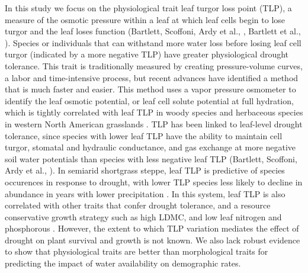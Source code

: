 \documentclass[12pt, letterpaper]{article}
\begin{document}
In this study we focus on the physiological trait leaf turgor loss point (TLP), a measure of the osmotic pressure within a leaf at which leaf cells begin to lose turgor and the leaf loses function (Bartlett, Scoffoni, Ardy et al., , Bartlett et al., ). Species or individuals that can withstand more water loss before losing leaf cell turgor (indicated by a more negative TLP) have greater physiological drought tolerance. This trait is traditionally measured by creating pressure-volume curves, a labor and time-intensive process, but recent advances have identified a method that is much faster and easier. This method uses a vapor pressure osmometer to identify the leaf osmotic potential, or leaf cell solute potential at full hydration, which is tightly correlated with leaf TLP in woody species \cite{Bartlett2012a} and herbaceous species in western North American grasslands \cite{Griffin-Nolan2019}. TLP has been linked to leaf-level drought tolerance, since species with lower leaf TLP have the ability to maintain cell turgor, stomatal and hydraulic conductance, and gas exchange at more negative soil water potentials than species with less negative leaf TLP (Bartlett, Scoffoni, Ardy et al., ). In semiarid shortgrass steppe, leaf TLP is predictive of species occurences in response to drought, with lower TLP species less likely to decline in abundance in years with lower precipitation \cite{Wilcox2020PlantPrairie}. In this system, leaf TLP is also correlated with other traits that confer drought tolerance, and a resource conservative growth strategy such as high LDMC, and low leaf nitrogen and phosphorous \cite{Blumenthal2020}. However, the extent to which TLP variation mediates the effect of drought on plant survival and growth is not known. We also lack robust evidence to show that physiological traits are better than morphological traits for predicting the impact of water availability on demographic rates.
\end{document}

